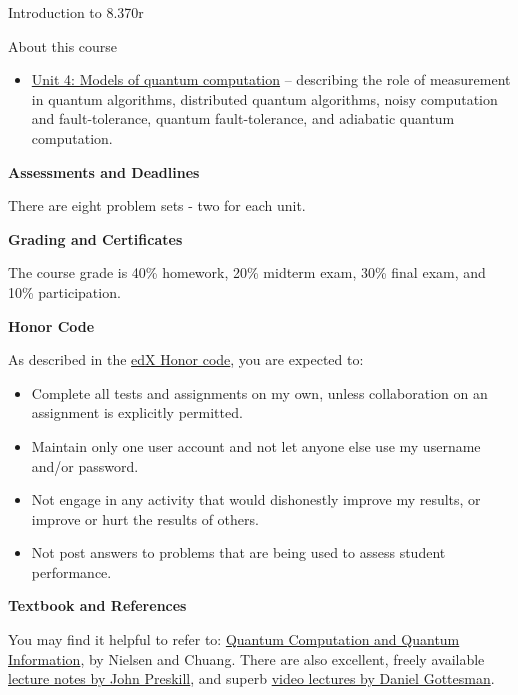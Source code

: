 \begin{edXsection}{Introduction to 8.370r}
\begin{edXtext}{About this course}
\begin{itemize}
\item{\href{/course/courseware/unit4}{Unit 4: Models of quantum
    computation}} -- describing the role of measurement in quantum
  algorithms, distributed quantum algorithms, noisy computation and
  fault-tolerance, quantum fault-tolerance, and adiabatic quantum
  computation.

\end{itemize}

{\noindent\bf\Large Assessments and Deadlines}

There are eight problem sets - two for each unit.  

{\noindent\bf\Large Grading and Certificates}

The course grade is 40\% homework, 20\% midterm exam, 30\% final exam, and 10\% participation.

{\noindent\bf\Large Honor Code}

As described in the \href{https://www.edx.org/edx-terms-service}{edX Honor code}, you are expected to:

\begin{itemize}
  \item
    Complete all tests and assignments on my own, unless collaboration on an assignment is explicitly permitted.
  \item
    Maintain only one user account and not let anyone else use my username and/or password.
  \item
    Not engage in any activity that would dishonestly improve my results, or improve or hurt the results of others.
  \item
    Not post answers to problems that are being used to assess student performance.
\end{itemize}

{\noindent\bf\Large Textbook and References}

You may find it helpful to refer to:
\href{https://www.amazon.com/Quantum-Computation-Information-10th-Anniversary/dp/1107002176}{Quantum
  Computation and Quantum Information}, by Nielsen and Chuang.  There are also excellent, freely available 
\href{http://www.theory.caltech.edu/~preskill/ph219/index.html#lecture}{lecture notes by John Preskill}, and 
superb \href{http://pirsa.org/C15009}{video lectures by Daniel Gottesman}.


\end{edXtext}

\end{edXsection}

